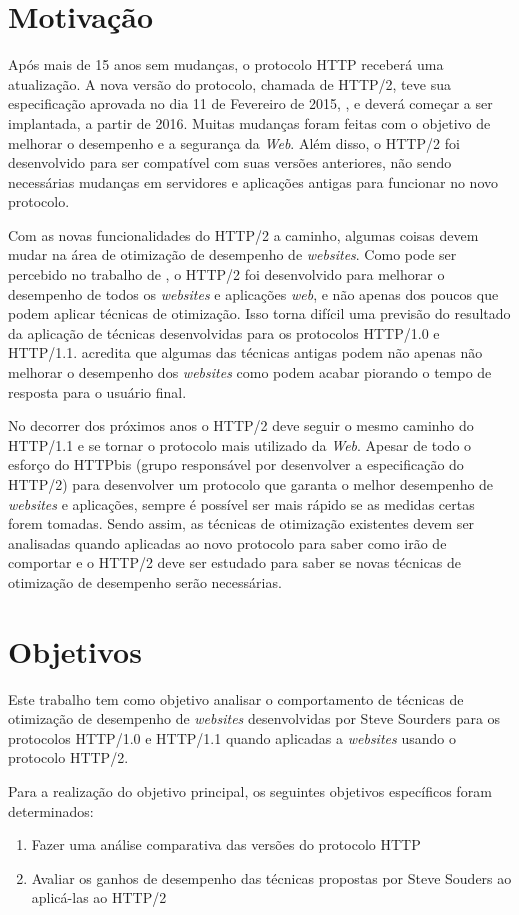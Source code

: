\section{Motivação}
\label{sec:motivacao}

Após mais de 15 anos sem mudanças, o protocolo HTTP receberá uma atualização. A nova versão do protocolo, chamada de HTTP/2, teve sua especificação aprovada no dia 11 de Fevereiro de 2015, \cite{HTTP2Spec}, e deverá começar a ser implantada, a partir de 2016. Muitas mudanças foram feitas com o objetivo de melhorar o desempenho e a segurança da \textit{Web}. Além disso, o HTTP/2 foi desenvolvido para ser compatível com suas versões anteriores, não sendo necessárias mudanças em servidores e aplicações antigas para funcionar no novo protocolo.

Com as novas funcionalidades do HTTP/2 a caminho, algumas coisas devem mudar na área de otimização de desempenho de \textit{websites}. Como pode ser percebido no trabalho de , o HTTP/2 foi desenvolvido para melhorar o desempenho de todos os \textit{websites} e aplicações \textit{web}, e não apenas dos poucos que podem aplicar técnicas de otimização. Isso torna difícil uma previsão do resultado da aplicação de técnicas desenvolvidas para os protocolos HTTP/1.0 e HTTP/1.1.  acredita que algumas das técnicas antigas podem não apenas não melhorar o desempenho dos \textit{websites} como podem acabar piorando o tempo de resposta para o usuário final.

No decorrer dos próximos anos o HTTP/2 deve seguir o mesmo caminho do HTTP/1.1 e se tornar o protocolo mais utilizado da \textit{Web}. Apesar de todo o esforço do HTTPbis (grupo responsável por desenvolver a especificação do HTTP/2) para desenvolver um protocolo que garanta o melhor desempenho de \textit{websites} e aplicações, sempre é possível ser mais rápido se as medidas certas forem tomadas. Sendo assim, as técnicas de otimização existentes devem ser analisadas quando aplicadas ao novo protocolo para saber como irão de comportar e o HTTP/2 deve ser estudado para saber se novas técnicas de otimização de desempenho serão necessárias.

\section{Objetivos}
\label{sec:objetivos}

Este trabalho tem como objetivo analisar o comportamento de técnicas de otimização de desempenho de \textit{websites} desenvolvidas por Steve Sourders para os protocolos HTTP/1.0 e HTTP/1.1 quando aplicadas a \textit{websites} usando o protocolo HTTP/2.

Para a realização do objetivo principal, os seguintes objetivos específicos foram determinados:

\begin{enumerate}
	\item Fazer uma análise comparativa das versões do protocolo HTTP
	\item Avaliar os ganhos de desempenho das técnicas propostas por Steve Souders ao aplicá-las ao HTTP/2
\end{enumerate}